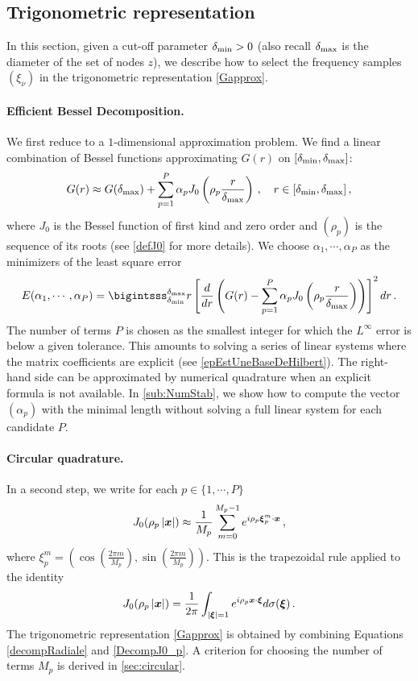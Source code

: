 \documentclass[main]{subfiles}
\begin{document}
\setcounter{equation}{0}
\label{sec:overview}

\subsection{Trigonometric representation}

In this section, given a cut-off parameter $\delta_{\min} > 0$ (also recall $\delta_{\max}$ is the diameter of the set of nodes $z$), we describe how to select the frequency samples $(\xi_\nu)$ in the trigonometric representation \eqref{Gapprox}.

\paragraph{Efficient Bessel Decomposition.} 

We first reduce to a $1$-dimensional approximation problem. We find a linear combination of Bessel functions approximating $G(r)$ on $[\delta_{\min},\delta_{\max}]$:
\begin{equation}
G(r) \approx G(\delta_{\max}) + \sum_{p=1}^P \alpha_p J_0\left(\rho_p \frac{r}{\delta_{\max}}\right)\,, \quad r \in [\delta_{\min},\delta_{\max}]\,,\label{decompRadiale}
\end{equation}
where $J_0$ is the Bessel function of first kind and zero order and $(\rho_p)$ is the sequence of its roots (see \autoref{defJ0} for more details). We choose $\alpha_1,\cdots, \alpha_{P}$ as the minimizers of the least square error
\[E(\alpha_1,\cdots,\alpha_P) = \bigintsss_{\rmin}^{\rmax}r \left[\frac{d}{dr}\left(G(r) - \sum_{p=1}^P \alpha_p J_0\left(\rho_p \frac {r}{\rmax}\right)\right)\right]^2 dr\,.\]
The number of terms $P$ is chosen as the smallest integer for which the $L^\infty$ error is below a given tolerance. This amounts to solving a series of linear systems where the matrix coefficients are explicit (see \autoref{epEstUneBaseDeHilbert}). The right-hand side can be approximated by numerical quadrature when an explicit formula is not available. In \autoref{sub:NumStab}, we show how to compute the vector $(\alpha_p)$ with the minimal length without solving a full linear system for each candidate $P$.   
\paragraph{Circular quadrature.}In a second step, we write for each $p \in \{ 1,\cdots, P \}$
\begin{equation}
J_0(\rho_p \left\lvert \boldsymbol{x} \right\rvert) \approx \dfrac{1}{M_p}\sum_{m=0}^{M_p-1}e^{i \rho_p \boldsymbol{\xi}_p^m \cdot \boldsymbol{x}}\,,
\label{DecompJ0_p}
\end{equation}
where $\xi^m_p = \left(\cos\left(\frac{2\pi m}{M_p}\right),\sin\left(\frac{2\pi m}{M_p}\right)\right)$. This is the trapezoidal rule applied to the identity
\[ J_0(\rho_p\left\lvert \boldsymbol{x} \right\rvert) = \frac{1}{2\pi}\int_{\left\lvert \boldsymbol{\xi} \right\rvert=1}{e^{i \rho_p\boldsymbol{x} \cdot \boldsymbol{\xi}}} d\sigma(\boldsymbol{\xi})\,.\]
The trigonometric representation \eqref{Gapprox} is obtained by combining Equations \eqref{decompRadiale} and \eqref{DecompJ0_p}. A criterion for choosing the number of terms $M_p$ is derived in \autoref{sec:circular}.  
\end{document}
